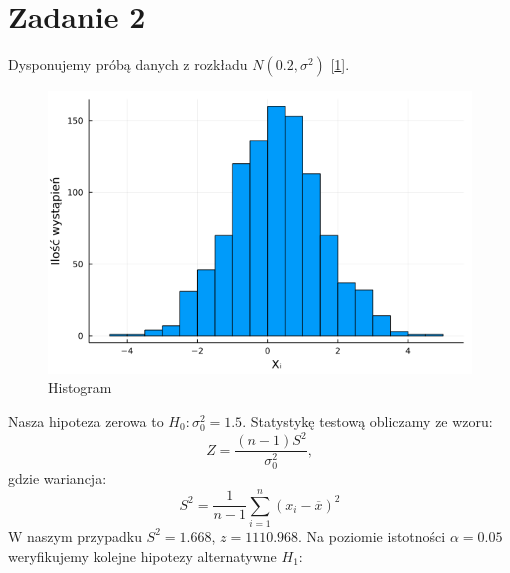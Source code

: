 \documentclass{article}
\theoremstyle{break}
\begin{document}
\section*{Zadanie 2}
Dysponujemy próbą danych z rozkładu $N(0.2,\sigma^2)$ [\ref{fig:hist2}].
\begin{figure}[H]
	\begin{center}
		\includegraphics[scale=0.5]{hist2.png}
		\caption{Histogram}
		\label{fig:hist2}
	\end{center}
\end{figure}
Nasza hipoteza zerowa to $H_0: \sigma^2_0 = 1.5$. Statystykę testową obliczamy ze wzoru:
$$Z=\frac{(n-1)S^2}{\sigma^2_0},$$ 
gdzie wariancja:
$$S^2=\frac{1}{n-1}\sum\limits_{i=1}^{n}(x_i - \overline{x})^2$$
W naszym przypadku $S^2=1.668$, $z=1110.968$.
Na poziomie istotności $\alpha = 0.05$ weryfikujemy kolejne hipotezy alternatywne $H_1$:
\end{document}
